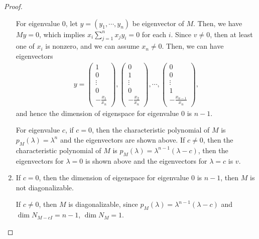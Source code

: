 \documentclass[11pt]{article}
\theoremstyle{definition}
\numberwithin{equation}{subsection}
\begin{document}
\begin{proof}
\begin{enumerate}[label=(\alph*)]
    For eigenvalue $0$, let $y = (y_1, \cdots, y_n)$ be eigenvector of $M$. Then, we have $My = 0$, which implies $x_i \sum^n_{j=1} x_j y_i = 0$ for each $i$. Since $v \neq 0$, then at least one of $x_i$ is nonzero, and we can assume $x_n \neq 0$. Then, we can have eigenvectors
    \begin{align*}
        y = \begin{pmatrix} 1 \\ 0 \\ \vdots \\ 0 \\ - \frac{x_1}{x_n} \end{pmatrix}, \begin{pmatrix} 0 \\ 1 \\ \vdots \\ 0 \\ - \frac{x_2}{x_n} \end{pmatrix}, \cdots, \begin{pmatrix} 0 \\ 0 \\ \vdots \\ 1 \\ - \frac{x_{n-1}}{x_n} \end{pmatrix},
    \end{align*}
    and hence the dimension of eigenspace for eigenvalue $0$ is $n - 1$.
    
    For eigenvalue $c$, if $c = 0$, then the characteristic polynomial of $M$ is $p_M(\lambda) = \lambda^n$ and the eigenvectors are shown above. If $c \neq 0$, then the characteristic polynomial of $M$ is $p_M(\lambda) = \lambda^{n - 1}(\lambda - c)$, then the eigenvectors for $\lambda = 0$ is shown above and the eigenvectors for $\lambda = c$ is $v$.
    
    \item If $c = 0$, then the dimension of eigenspace for eigenvalue $0$ is $n - 1$, then $M$ is not diagonalizable.
    
    If $c \neq 0$, then $M$ is diagonalizable, since $p_M(\lambda) = \lambda^{n - 1}(\lambda - c)$ and $\dim N_{M - cI} = n - 1$, $\dim N_{M} = 1$.
\end{enumerate}
\end{proof}

\medskip
\end{document}
